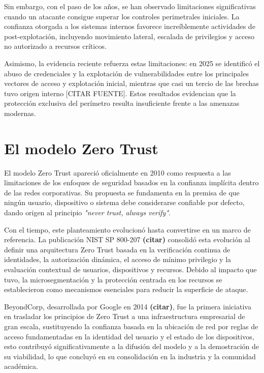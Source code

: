 \documentclass[11pt,spanish,listoffigures,listoftables]{tfgetsinf}
\begin{document}
    Sin embargo, con el paso de los años, se han observado limitaciones significativas cuando un atacante consigue superar los controles perimetrales iniciales. La confianza otorgada a los sistemas internos favorece increíblemente actividades de post-explotación, incluyendo movimiento lateral, escalada de privilegios y acceso no autorizado a recursos críticos.
    
    Asimismo, la evidencia reciente refuerza estas limitaciones: en 2025 se identificó el abuso de credenciales y la explotación de vulnerabilidades entre los principales vectores de acceso y explotación inicial, mientras que casi un tercio de las brechas tuvo origen interno [CITAR FUENTE].  Estos resultados evidencian que la protección exclusiva del perímetro resulta insuficiente frente a las amenazas modernas.

    \section{El modelo Zero Trust}
    \label{sec:2.2}
    El modelo Zero Trust apareció oficialmente en 2010 como respuesta a las limitaciones de los enfoques de seguridad basados en la confianza implícita dentro de las redes corporativas. Su propuesta se fundamenta en la premisa de que ningún usuario, dispositivo o sistema debe considerarse confiable por defecto, dando origen al principio \emph{"never trust, always verify"}.
     
    Con el tiempo, este planteamiento evolucionó hasta convertirse en un marco de referencia. La publicación NIST SP 800-207 \textbf{(citar)} consolidó esta evolución al definir una arquitectura Zero Trust basada en la verificación continua de identidades, la autorización dinámica, el acceso de mínimo privilegio y la evaluación contextual de usuarios, dispositivos y recursos. Debido al impacto que tuvo, la microsegmentación y la protección centrada en los recursos se establecieron como mecanismos esenciales para reducir la superficie de ataque.
    
    BeyondCorp, desarrollada por Google en 2014 \textbf{(citar)}, fue la primera iniciativa en trasladar los principios de Zero Trust a una infraestructura empresarial de gran escala, sustituyendo la confianza basada en la ubicación de red por reglas de acceso fundamentadas en la identidad del usuario y el estado de los dispositivos, esto contribuyó significativamente a la difusión del modelo y a la demostración de su viabilidad, lo que concluyó en su consolidación en la industria y la comunidad académica.
\end{document}
